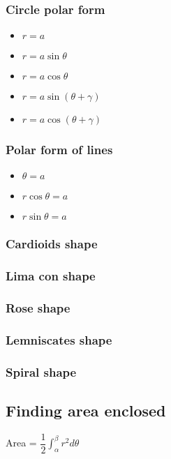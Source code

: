 \subsubsection{Circle polar form}
\begin{itemize}
	\item $r=a$
	\item $r=a\sin\theta$
	\item $r=a\cos\theta$
	\item $r=a\sin(\theta+\gamma)$
	\item $r=a\cos(\theta+\gamma)$
\end{itemize}

\subsubsection{Polar form of lines}
\begin{itemize}
	\item $\theta=a$
	\item $r\cos\theta=a$
	\item $r\sin\theta=a$
\end{itemize}

\subsubsection{Cardioids shape}
\subsubsection{Lima con shape}
\subsubsection{Rose shape}
\subsubsection{Lemniscates shape}
\subsubsection{Spiral shape}




\subsection{Finding area enclosed}
Area = $\dfrac{1}{2}\int_{\alpha}^{\beta} r^2d\theta$